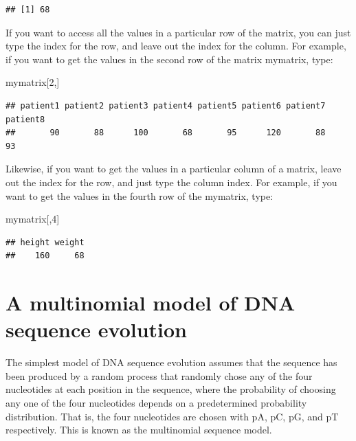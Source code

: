 \documentclass[
]{book}
\newenvironment{Shaded}{\begin{snugshade}}{\end{snugshade}}
\newcommand{\DecValTok}[1]{\textcolor[rgb]{0.00,0.00,0.81}{#1}}
\newcommand{\NormalTok}[1]{#1}
\begin{document}
\begin{verbatim}
## [1] 68
\end{verbatim}

If you want to access all the values in a particular row of the matrix, you can just type the index for the row, and leave out the index for the column. For example, if you want to get the values in the second row of the matrix mymatrix, type:

\begin{Shaded}
\begin{Highlighting}[]
\NormalTok{mymatrix[}\DecValTok{2}\NormalTok{,]}
\end{Highlighting}
\end{Shaded}

\begin{verbatim}
## patient1 patient2 patient3 patient4 patient5 patient6 patient7 patient8 
##       90       88      100       68       95      120       88       93
\end{verbatim}

Likewise, if you want to get the values in a particular column of a matrix, leave out the index for the row, and just type the column index. For example, if you want to get the values in the fourth row of the mymatrix, type:

\begin{Shaded}
\begin{Highlighting}[]
\NormalTok{mymatrix[,}\DecValTok{4}\NormalTok{]}
\end{Highlighting}
\end{Shaded}

\begin{verbatim}
## height weight 
##    160     68
\end{verbatim}

\hypertarget{a-multinomial-model-of-dna-sequence-evolution}{%
\section{A multinomial model of DNA sequence evolution}\label{a-multinomial-model-of-dna-sequence-evolution}}

The simplest model of DNA sequence evolution assumes that the sequence has been produced by a random process that randomly chose any of the four nucleotides at each position in the sequence, where the probability of choosing any one of the four nucleotides depends on a predetermined probability distribution. That is, the four nucleotides are chosen with pA, pC, pG, and pT respectively. This is known as the multinomial sequence model.
\end{document}
